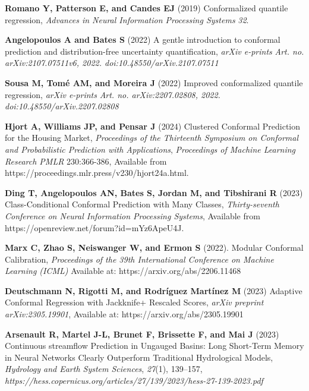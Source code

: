 \documentclass[ruler]{CUP-JNL-EDS}%
\begin{document}
\begin{Backmatter}
\begin{thebibliography}{}
\textbf{Romano Y, Patterson E, and Candes EJ} (2019) Conformalized quantile regression, \textit{Advances in Neural Information Processing Systems} \textit{32}.

\textbf{Angelopoulos A and Bates S} (2022) A gentle introduction to conformal prediction and distribution-free uncertainty quantification, \textit{arXiv e-prints} \textit{Art. no. arXiv:2107.07511v6, 2022. doi:10.48550/arXiv.2107.07511}

\textbf{Sousa M, Tomé AM, and Moreira J} (2022) Improved conformalized quantile regression, \textit{arXiv e-prints} \textit{Art. no. arXiv:2207.02808, 2022. doi:10.48550/arXiv.2207.02808}

\textbf{Hjort A, Williams JP, and Pensar J} (2024) Clustered Conformal Prediction for the Housing Market, \textit{Proceedings of the Thirteenth Symposium on Conformal and Probabilistic Prediction with Applications}, \textit{Proceedings of Machine Learning Research PMLR} 230:366-386, Available from https://proceedings.mlr.press/v230/hjort24a.html.

\textbf{Ding T, Angelopoulos AN, Bates S, Jordan M, and Tibshirani R} (2023) Class-Conditional Conformal Prediction with Many Classes, \textit{Thirty-seventh Conference on Neural Information Processing Systems}, Available from https://openreview.net/forum?id=mYz6ApeU4J.

\textbf{Marx C, Zhao S, Neiswanger W, and Ermon S} (2022). Modular Conformal Calibration, \textit{Proceedings of the 39th International Conference on Machine Learning (ICML)} Available at: https://arxiv.org/abs/2206.11468

\textbf{Deutschmann N, Rigotti M, and Rodríguez Martínez M} (2023) Adaptive Conformal Regression with Jackknife+ Rescaled Scores, \textit{arXiv preprint arXiv:2305.19901}, Available at: https://arxiv.org/abs/2305.19901

\textbf{Arsenault R, Martel J-L, Brunet F, Brissette F, and Mai J} (2023) Continuous streamflow Prediction in Ungauged Basins: Long Short-Term Memory in Neural Networks Clearly Outperform Traditional Hydrological Models, \textit{Hydrology and Earth System Sciences}, \textit{27}(1), 139–157, \textit{https://hess.copernicus.org/articles/27/139/2023/hess-27-139-2023.pdf}


\end{thebibliography}
\end{Backmatter}
\end{document}

